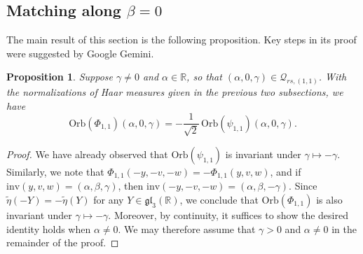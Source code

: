 \documentclass[reqno, 11pt]{amsart} %
\numberwithin{equation}{section}
\theoremstyle{plain}
\newtheorem{proposition}[theorem]{Proposition}
\theoremstyle{definition}
\theoremstyle{remark}
\newcommand{\bbR}{\mathbb R}
\newcommand{\lie}[1]{ \mathfrak{#1}}
\newcommand{\Orb}{\mathrm{Orb}}
\newcommand{\inv}{\mathrm{inv}}
\begin{document}
\subsection{Matching along $\beta = 0$}
The main result of this section is the following proposition. 
 Key steps in its proof were suggested by Google Gemini.
\begin{proposition} \label{prop:beta = 0 match}
Suppose $\gamma \neq 0$ and $\alpha \in \mathbb R$, so that $(\alpha, 0, \gamma) \in \mathcal Q_{rs,(1,1)}$. With the normalizations of Haar measures given in the previous two subsections, we have
\[
\Orb(\Phi_{1,1})(\alpha, 0, \gamma)  =  - \frac1{\sqrt{2}} \, \Orb(\psi_{1,1})(\alpha, 0, \gamma).
\]
\end{proposition}
\begin{proof}
 We have already observed that $\Orb(\psi_{1,1})$ is invariant under $\gamma \mapsto - \gamma$. Similarly, we note that $\Phi_{1,1}(-y,-v,-w) = - \Phi_{1,1}(y,v,w)$, and if $\inv(y,v,w)= (\alpha,\beta,\gamma) $, then $\inv(-y,-v,-w) =  (\alpha,\beta, -\gamma)$. Since $\tilde \eta(-Y) = - \tilde \eta(Y)$ for any $Y \in \lie{gl}_3(\bbR)$, we conclude that $\Orb(\Phi_{1,1})$ is also invariant under $\gamma \mapsto - \gamma$. Moreover, by continuity, it suffices to show the desired identity holds when $\alpha \neq 0$. We may therefore assume that $\gamma > 0$ and $\alpha \neq 0$ in the remainder of the proof.


\end{proof}
\end{document}
